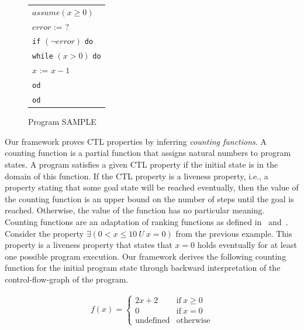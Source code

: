 \documentclass[11pt,a4paper,titlepage]{article}
\theoremstyle{definition}
\begin{document}
\begin{figure}
    \begin{center}
        \begin{tabular}{l}
            $assume(x \geq 0)$ \\
            $error$ := ? \\
            \texttt{if} $(\neg error)$ \texttt{do} \\
            \hspace{1em}\texttt{while} $(x > 0)$ \texttt{do} \\
            \hspace{2em}$x$ := $x - 1$ \\
            \hspace{1em}\texttt{od}\\
            \texttt{od}
        \end{tabular}
    \end{center}
    \vspace{-1em}
    \caption{Program \textsf{SAMPLE}}
    \label{fig:introduction_sample}
\end{figure}

Our framework proves CTL properties by inferring \emph{counting functions}. 
A counting function is a partial function that assigns 
natural numbers to program states. A program satisfies a given CTL property if the initial state is in the domain of this function. 
If the CTL property is a liveness property, i.e., a property stating that some goal state will be reached eventually, 
then the value of the counting function is an upper bound on the number of steps until the goal is reached. 
Otherwise, the value of the function has no particular meaning. Counting functions are an adaptation of ranking functions 
as defined in~\cite{CousotCousot-POPL12} and~\cite{UrbanM-VMCAI15}.\\

Consider the property 
$\exists(0 < x \leq 10 \ U \ x = 0)$ from the previous example. This property is a liveness property that states that $x = 0$ holds eventually for at least
one possible program execution. Our framework derives the following counting function for the initial program state 
through backward interpretation of the control-flow-graph of the program. 

\begin{align*}
f(x) = \begin{cases}
    2x + 2 & \text{if} \ x \geq 0 \\
    0 & \text{if} \ x = 0 \\
    \text{undefined}    & \text{otherwise}
\end{cases}
\end{align*}
\end{document}
